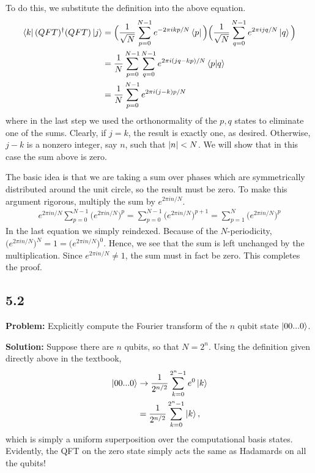 \documentclass{article}
\begin{document}
To do this, we substitute the definition into the above equation. 
\begin{align} \label{eq:5.1:expand_and_simplify}
\begin{aligned}
    \bra{k}(QFT)^\dagger(QFT)\ket{j} &= \Big(\frac{1}{\sqrt{N}}\sum_{p=0}^{N-1}e^{-2\pi ikp/N}\bra{p}\Big)\Big(\frac{1}{\sqrt{N}}\sum_{q=0}^{N-1}e^{2\pi ijq/N}\ket{q}\Big) \\
    &= \frac{1}{N}\sum_{p=0}^{N-1}\sum_{q=0}^{N-1}e^{2\pi i(jq-kp)/N}\braket{p}{q} \\
    &= \frac{1}{N}\sum_{p=0}^{N-1} e^{2\pi i (j-k)p/N}
\end{aligned}
\end{align}
where in the last step we used the orthonormality of the $p,q$ states to eliminate one of the sums. Clearly, if $j=k$, the result is exactly one, as desired. Otherwise, $j-k$ is a nonzero integer, say $n$, such that $\abs{n}<N$. We will show that in this case the sum above is zero. 

The basic idea is that we are taking a sum over phases which are symmetrically distributed around the unit circle, so the result must be zero. To make this argument rigorous, multiply the sum by $e^{2\pi i n/N}$.
\begin{align}
    e^{2\pi i n/N}\sum_{p=0}^{N-1}\big(e^{2\pi i n/N}\big)^p = \sum_{p=0}^{N-1}\big(e^{2\pi i n/N}\big)^{p+1} = \sum_{p=1}^{N}\big(e^{2\pi i n/N}\big)^{p}
\end{align}
In the last equation we simply reindexed. Because of the $N$-periodicity, $\big(e^{2\pi i n/N}\big)^N = 1 = \big(e^{2\pi i n/N}\big)^0$. Hence, we see that the sum is left unchanged by the multiplication. Since $e^{2\pi i n/N} \neq 1$, the sum must in fact be zero. This completes the proof.

\subsection*{5.2}
\textbf{Problem:} Explicitly compute the Fourier transform of the $n$ qubit state $\ket{00...0}$.

\textbf{Solution:} Suppose there are $n$ qubits, so that $N=2^n$. Using the definition given directly above in the textbook,
\begin{align}
    \ket{00...0} &\rightarrow \frac{1}{2^{n/2}} \sum_{k=0}^{2^n-1}e^0 \ket{k} \\
    &= \frac{1}{2^{n/2}}\sum_{k=0}^{2^n-1}\ket{k},
\end{align}
which is simply a uniform superposition over the computational basis states. Evidently, the QFT on the zero state simply acts the same as Hadamards on all the qubits!
\end{document}
